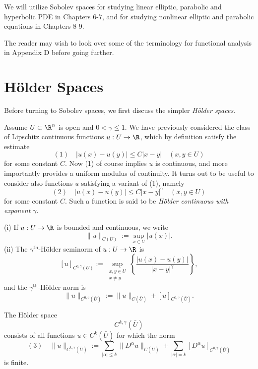 We will utilize Sobolev spaces for studying linear elliptic, parabolic and hyperbolic PDE in Chapters 6-7, and for studying nonlinear elliptic and parabolic equations in Chapters 8-9.

The reader may wish to look over some of the terminology for functional analysis in Appendix D before going further.

\section{Hölder Spaces}
\label{sec:holder-spaces}

Before turning to Sobolev spaces, we first discuss the simpler \textit{Hölder spaces}.

Assume $U \subset \R^n$ is open and $0 < \gamma \le 1$. We have previously considered the class of Lipschitz continuous functions $u : U \to \R$, which by definition satisfy the estimate
$$(1) \quad |u(x) - u(y)| \le C|x - y| \quad (x,y \in U)$$
for some constant $C$. Now (1) of course implies $u$ is continuous, and more importantly provides a uniform modulus of continuity. It turns out to be useful to consider also functions $u$ satisfying a variant of (1), namely
$$(2) \quad |u(x) - u(y)| \le C|x - y|^\gamma \quad (x,y \in U)$$
for some constant $C$. Such a function is said to be \textit{Hölder continuous with exponent} $\gamma$.

\begin{definition}
\label{def:holder-seminorm-sup-norm}
(i) If $u : U \to \R$ is bounded and continuous, we write
$$\|u\|_{C(U)} := \sup_{x \in U} |u(x)|.$$
(ii) The $\gamma^{\text{th}}$-Hölder seminorm of $u : U \to \R$ is
$$[u]_{C^{0,\gamma}(U)} := \sup_{\substack{x,y \in U \\ x \ne y}} \left\{ \frac{|u(x) - u(y)|}{|x - y|^\gamma} \right\},$$
and the $\gamma^{\text{th}}$-Hölder norm is
$$\|u\|_{C^{0,\gamma}(\bar U)} := \|u\|_{C(\bar U)} + [u]_{C^{0,\gamma}(\bar U)}.$$
\end{definition}

\begin{definition}
\label{def:holder-space}
The Hölder space
$$C^{k,\gamma}(\bar U)$$
consists of all functions $u \in C^k(\bar U)$ for which the norm
$$(3) \quad \|u\|_{C^{k,\gamma}(\bar U)} := \sum_{|\alpha| \le k} \|D^\alpha u\|_{C(\bar U)} + \sum_{|\alpha| = k} [D^\alpha u]_{C^{0,\gamma}(\bar U)}$$
is finite.
\end{definition}

